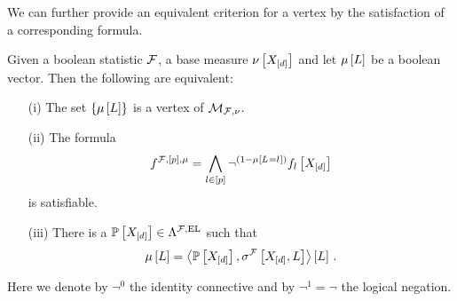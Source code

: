 We can further provide an equivalent criterion for a vertex by the satisfaction of a corresponding formula.

\begin{theorem}
    Given a boolean statistic $\mathcal{F}$, a base measure $\nu\left[X_{[d]}\right]$ and let $\mu\left[L\right]$ be a boolean vector.
    Then the following are equivalent:
    \begin{itemize}
        \item[(i)] The set $\{\mu\left[L\right]\}$ is a vertex of $\mathcal{M}_{\mathcal{F},\nu}$.
        \item[(ii)] The formula
        \begin{align*}
            f^{\mathcal{F},[p],\mu} = \bigwedge_{l\in[p]} \lnot^{(1-\mu\left[L_{}=l_{}\right])} f_{l}\left[X_{[d]}\right]
        \end{align*}
        is satisfiable.
        \item[(iii)] There is a \HardLogicNetwork{} $\mathbb{P}\left[X_{[d]}\right]\in\Lambda^{\mathcal{F},\mathrm{EL}}$ such that
        \begin{align*}
            \mu\left[L\right] = \left\langle \mathbb{P}\left[X_{[d]}\right],\sigma^{\mathcal{F}}\left[X_{[d]},L\right]\right\rangle \left[ L \right] \, .
        \end{align*}
    \end{itemize}
    Here we denote by $\lnot^0$ the identity connective and by $\lnot^1=\lnot$ the logical negation.
\end{theorem}
